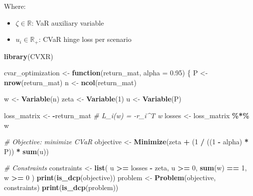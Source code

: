 \documentclass[
]{article}
\newenvironment{Shaded}{\begin{snugshade}}{\end{snugshade}}
\newcommand{\AttributeTok}[1]{\textcolor[rgb]{0.13,0.29,0.53}{#1}}
\newcommand{\CommentTok}[1]{\textcolor[rgb]{0.56,0.35,0.01}{\textit{#1}}}
\newcommand{\ControlFlowTok}[1]{\textcolor[rgb]{0.13,0.29,0.53}{\textbf{#1}}}
\newcommand{\DecValTok}[1]{\textcolor[rgb]{0.00,0.00,0.81}{#1}}
\newcommand{\FloatTok}[1]{\textcolor[rgb]{0.00,0.00,0.81}{#1}}
\newcommand{\FunctionTok}[1]{\textcolor[rgb]{0.13,0.29,0.53}{\textbf{#1}}}
\newcommand{\NormalTok}[1]{#1}
\newcommand{\OtherTok}[1]{\textcolor[rgb]{0.56,0.35,0.01}{#1}}
\newcommand{\SpecialCharTok}[1]{\textcolor[rgb]{0.81,0.36,0.00}{\textbf{#1}}}
\providecommand{\tightlist}{%
  \setlength{\itemsep}{0pt}\setlength{\parskip}{0pt}}
\begin{document}
Where:

\begin{itemize}
\tightlist
\item
  \(\zeta \in \mathbb{R}\): VaR auxiliary variable
\item
  \(u_i \in \mathbb{R}_{+}\): CVaR hinge loss per scenario
\end{itemize}

\begin{Shaded}
\begin{Highlighting}[]
\FunctionTok{library}\NormalTok{(CVXR)}

\NormalTok{cvar\_optimization }\OtherTok{\textless{}{-}} \ControlFlowTok{function}\NormalTok{(return\_mat, }\AttributeTok{alpha =} \FloatTok{0.95}\NormalTok{) \{}
\NormalTok{  P }\OtherTok{\textless{}{-}} \FunctionTok{nrow}\NormalTok{(return\_mat)}
\NormalTok{  n }\OtherTok{\textless{}{-}} \FunctionTok{ncol}\NormalTok{(return\_mat)}

\NormalTok{  w }\OtherTok{\textless{}{-}} \FunctionTok{Variable}\NormalTok{(n)}
\NormalTok{  zeta }\OtherTok{\textless{}{-}} \FunctionTok{Variable}\NormalTok{(}\DecValTok{1}\NormalTok{)}
\NormalTok{  u }\OtherTok{\textless{}{-}} \FunctionTok{Variable}\NormalTok{(P)}

\NormalTok{  loss\_matrix }\OtherTok{\textless{}{-}} \SpecialCharTok{{-}}\NormalTok{return\_mat  }\CommentTok{\# L\_i(w) = {-}r\_i\^{}T w}
\NormalTok{  losses }\OtherTok{\textless{}{-}}\NormalTok{ loss\_matrix }\SpecialCharTok{\%*\%}\NormalTok{ w}

  
  \CommentTok{\# Objective: minimize CVaR}
\NormalTok{  objective }\OtherTok{\textless{}{-}} \FunctionTok{Minimize}\NormalTok{(zeta }\SpecialCharTok{+}\NormalTok{ (}\DecValTok{1} \SpecialCharTok{/}\NormalTok{ ((}\DecValTok{1} \SpecialCharTok{{-}}\NormalTok{ alpha) }\SpecialCharTok{*}\NormalTok{ P)) }\SpecialCharTok{*} \FunctionTok{sum}\NormalTok{(u))}

  \CommentTok{\# Constraints}
\NormalTok{  constraints }\OtherTok{\textless{}{-}} \FunctionTok{list}\NormalTok{(}
\NormalTok{    u }\SpecialCharTok{\textgreater{}=}\NormalTok{ losses }\SpecialCharTok{{-}}\NormalTok{ zeta,}
\NormalTok{    u }\SpecialCharTok{\textgreater{}=} \DecValTok{0}\NormalTok{,}
    \FunctionTok{sum}\NormalTok{(w) }\SpecialCharTok{==} \DecValTok{1}\NormalTok{,}
\NormalTok{    w }\SpecialCharTok{\textgreater{}=} \DecValTok{0}
\NormalTok{  )}
  \FunctionTok{print}\NormalTok{(}\FunctionTok{is\_dcp}\NormalTok{(objective))}
\NormalTok{  problem }\OtherTok{\textless{}{-}} \FunctionTok{Problem}\NormalTok{(objective, constraints)}
  \FunctionTok{print}\NormalTok{(}\FunctionTok{is\_dcp}\NormalTok{(problem))}


\end{Highlighting}
\end{Shaded}
\end{document}
